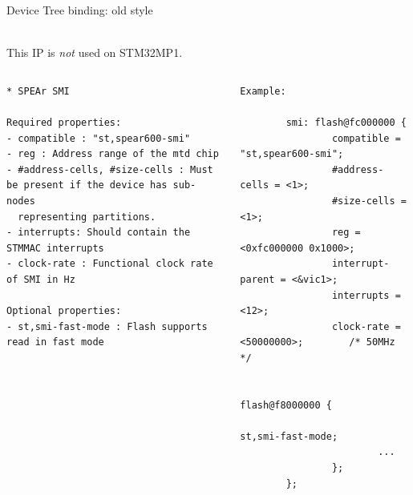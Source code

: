 \begin{frame}[fragile]{Device Tree binding: old style}
  \begin{center}
    \\
    This IP is {\em not} used on STM32MP1.
  \end{center}
  \begin{columns}[t]
    \begin{block}{}
      {\fontsize{5}{6}\selectfont
\begin{verbatim}
* SPEAr SMI

Required properties:
- compatible : "st,spear600-smi"
- reg : Address range of the mtd chip
- #address-cells, #size-cells : Must be present if the device has sub-nodes
  representing partitions.
- interrupts: Should contain the STMMAC interrupts
- clock-rate : Functional clock rate of SMI in Hz

Optional properties:
- st,smi-fast-mode : Flash supports read in fast mode

\end{verbatim}
      }
    \end{block}
    \begin{block}{}
      {\fontsize{4}{5}\selectfont
\begin{verbatim}
Example:

        smi: flash@fc000000 {
                compatible = "st,spear600-smi";
                #address-cells = <1>;
                #size-cells = <1>;
                reg = <0xfc000000 0x1000>;
                interrupt-parent = <&vic1>;
                interrupts = <12>;
                clock-rate = <50000000>;        /* 50MHz */

                flash@f8000000 {
                        st,smi-fast-mode;
                        ...
                };
        };
\end{verbatim}
      }
    \end{block}
  \end{columns}

\end{frame}

